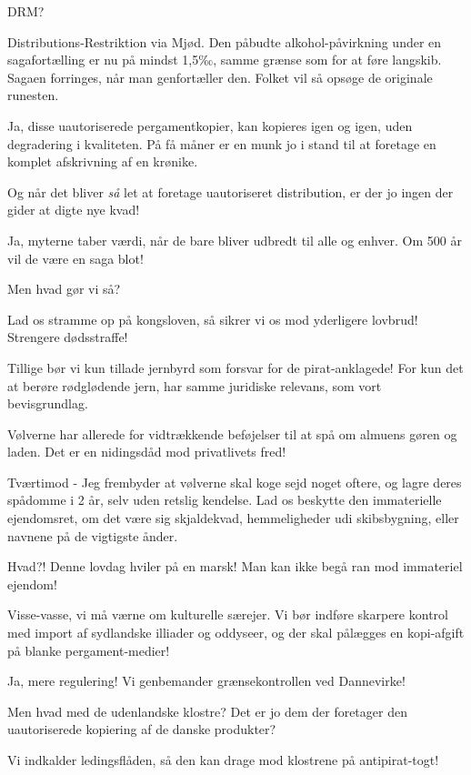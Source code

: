 \documentclass[a4paper,11pt]{article}
\begin{document}
\begin{sketch}
 DRM?

 Distributions-Restriktion via Mjød. Den påbudte
alkohol-påvirkning under en sagafortælling er nu på mindst 1,5‰, samme
grænse som for at føre langskib. Sagaen forringes, når man
genfortæller den. Folket vil så opsøge de originale runesten.

 Ja, disse uautoriserede pergamentkopier, kan kopieres igen
og igen, uden degradering i kvaliteten. På få måner er en munk jo i
stand til at foretage en komplet afskrivning af en krønike.

 Og når det bliver \textit{så} let at foretage uautoriseret
distribution, er der jo ingen der gider at digte nye kvad!

 Ja, myterne taber værdi, når de bare bliver udbredt til alle
og enhver. Om 500 år vil de være en saga blot!

 Men hvad gør vi så?

 Lad os stramme op på kongsloven, så sikrer vi os mod
yderligere lovbrud! Strengere dødsstraffe!

 Tillige bør vi kun tillade jernbyrd som forsvar for de
pirat-anklagede! For kun det at berøre rødglødende jern, har samme
juridiske relevans, som vort bevisgrundlag.

 Vølverne har allerede for vidtrækkende beføjelser til at spå
om almuens gøren og laden. Det er en nidingsdåd mod privatlivets fred!

 Tværtimod - Jeg frembyder at vølverne skal koge sejd noget
oftere, og lagre deres spådomme i 2 år, selv uden retslig
kendelse. Lad os beskytte den immaterielle ejendomsret, om det være
sig skjaldekvad, hemmeligheder udi skibsbygning, eller navnene på de
vigtigste ånder.

 Hvad?! Denne lovdag hviler på en marsk! Man kan ikke begå
ran mod immateriel ejendom!

 Visse-vasse, vi må værne om kulturelle særejer. Vi bør
indføre skarpere kontrol med import af sydlandske illiader og
oddyseer, og der skal pålægges en kopi-afgift på blanke
pergament-medier!

 Ja, mere regulering! Vi genbemander grænsekontrollen ved
Dannevirke!

 Men hvad med de udenlandske klostre? Det er jo dem der
foretager den uautoriserede kopiering af de danske produkter?

 Vi indkalder ledingsflåden, så den kan drage mod klostrene
på antipirat-togt!


\end{sketch}
\end{document}
